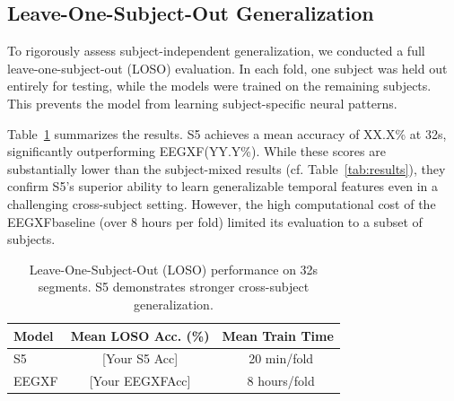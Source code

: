 \documentclass{article}
\newcommand{\eegtrans}{EEGXF}
\begin{document}


\subsection{Leave-One-Subject-Out Generalization}
To rigorously assess subject-independent generalization, we conducted a full leave-one-subject-out (LOSO) evaluation. In each fold, one subject was held out entirely for testing, while the models were trained on the remaining subjects. This prevents the model from learning subject-specific neural patterns.

Table~\ref{tab:loso_results} summarizes the results. S5 achieves a mean accuracy of XX.X\% at 32s, significantly outperforming \eegtrans (YY.Y\%). While these scores are substantially lower than the subject-mixed results (cf. Table~\ref{tab:results}), they confirm S5's superior ability to learn generalizable temporal features even in a challenging cross-subject setting. However, the high computational cost of the \eegtrans baseline (over 8 hours per fold) limited its evaluation to a subset of subjects.

\begin{table}[h]
\centering
\caption{Leave-One-Subject-Out (LOSO) performance on 32s segments. S5 demonstrates stronger cross-subject generalization.}
\label{tab:loso_results}
\begin{tabular}{lcc}
\toprule
\textbf{Model} & \textbf{Mean LOSO Acc. (\%)} & \textbf{Mean Train Time} \\
\midrule
S5 & [Your S5 Acc]%
& ~20 min/fold \\
\eegtrans & [Your \eegtrans Acc]%
& ~8 hours/fold \\
\bottomrule
\end{tabular}
\end{table}
\end{document}
